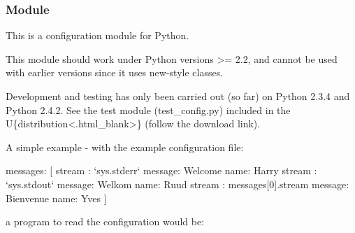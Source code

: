 \documentclass[a4paper,10pt,english]{sphinxmanual}
\begin{document}
\subsubsection{ Module}
\label{\detokenize{commands/apidoc/src:pyconf-module}}\label{\detokenize{commands/apidoc/src:module-src.pyconf}}
This is a configuration module for Python.

This module should work under Python versions \textgreater{}= 2.2, and cannot be used with
earlier versions since it uses new-style classes.

Development and testing has only been carried out (so far) on Python 2.3.4 and
Python 2.4.2. See the test module (test\_config.py) included in the
U\{distribution\textless{}.html\textbar{}\_blank\textgreater{}\} (follow the
download link).

A simple example - with the example configuration file:

%
\begin{sphinxVerbatim}[commandchars=\\\{\}]
messages:
[
  \PYGZob{}
    stream : {}`sys.stderr{}`
    message: \PYGZsq{}Welcome\PYGZsq{}
    name: \PYGZsq{}Harry\PYGZsq{}
  \PYGZcb{}
  \PYGZob{}
    stream : {}`sys.stdout{}`
    message: \PYGZsq{}Welkom\PYGZsq{}
    name: \PYGZsq{}Ruud\PYGZsq{}
  \PYGZcb{}
  \PYGZob{}
    stream : \PYGZdl{}messages[0].stream
    message: \PYGZsq{}Bienvenue\PYGZsq{}
    name: Yves
  \PYGZcb{}
]
\end{sphinxVerbatim}

a program to read the configuration would be:

%
\begin{sphinxVerbatim}[commandchars=\\\{\}]
   

  
  
   
         
           
      
         
\end{sphinxVerbatim}
\end{document}
